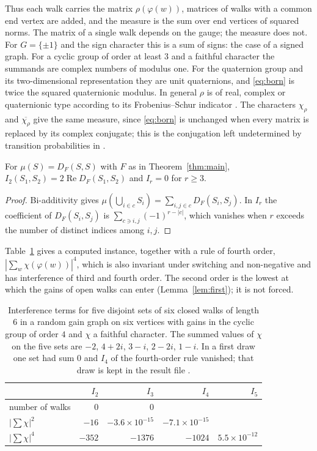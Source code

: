 Thus each walk carries the matrix $\rho(\varphi(w))$, matrices of walks with a common end vertex are added, and the measure is the sum over end vertices of squared norms. The matrix of a single walk depends on the gauge; the measure does not. For $G=\{\pm1\}$ and the sign character this is a sum of signs: the case of a signed graph. For a cyclic group of order at least $3$ and a faithful character the summands are complex numbers of modulus one. For the quaternion group and its two-dimensional representation they are unit quaternions, and \eqref{eq:born} is twice the squared quaternionic modulus. In general $\rho$ is of real, complex or quaternionic type according to its Frobenius--Schur indicator \cite{serre}. The characters $\chi_\rho$ and $\overline{\chi_\rho}$ give the same measure, since \eqref{eq:born} is unchanged when every matrix is replaced by its complex conjugate; this is the conjugation left undetermined by transition probabilities in \cite{g7}.

\begin{corollary}\label{cor:interf}
For $\mu(S)=D_F(S,S)$ with $F$ as in Theorem~\ref{thm:main}, $I_2(S_1,S_2)=2\operatorname{Re}D_F(S_1,S_2)$ and $I_r=0$ for $r\ge3$.
\end{corollary}
\begin{proof}
Bi-additivity gives $\mu(\bigcup_{i\in c}S_i)=\sum_{i,j\in c}D_F(S_i,S_j)$. In $I_r$ the coefficient of $D_F(S_i,S_j)$ is $\sum_{c\ni i,j}(-1)^{r-|c|}$, which vanishes when $r$ exceeds the number of distinct indices among $i,j$.
\end{proof}

Table~\ref{tab:interf} gives a computed instance, together with a rule of fourth order, $|\sum_w\chi(\varphi(w))|^4$, which is also invariant under switching and non-negative and has interference of third and fourth order. The second order is the lowest at which the gains of open walks can enter (Lemma~\ref{lem:first}); it is not forced.

\begin{table}[ht]\centering\small
\begin{tabular}{@{}lrrrr@{}}\toprule
 & $I_2$ & $I_3$ & $I_4$ & $I_5$\\\midrule
number of walks & $0$ & $0$ & & \\
$\bigl|\sum\chi\bigr|^2$ & $-16$ & $-3.6\times10^{-15}$ & $-7.1\times10^{-15}$ & \\
$\bigl|\sum\chi\bigr|^4$ & $-352$ & $-1376$ & $-1024$ & $5.5\times10^{-12}$\\\bottomrule
\end{tabular}
\caption{Interference terms for five disjoint sets of six closed walks of length $6$ in a random gain graph on six vertices with gains in the cyclic group of order $4$ and $\chi$ a faithful character. The summed values of $\chi$ on the five sets are $-2$, $4+2i$, $3-i$, $2-2i$, $1-i$. In a first draw one set had sum $0$ and $I_4$ of the fourth-order rule vanished; that draw is kept in the result file \cite{comp2}.}\label{tab:interf}
\end{table}

